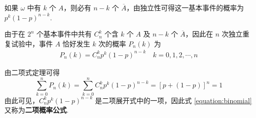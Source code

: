 如果 $\omega$ 中有 $k$ 个 $A$，则必有 $n-k$ 个 $\overline{A}$，由独立性可得这一基本事件的概率为 $p^k (1-p)^{n-k}$.

由于在 $2^n$ 个基本事件中共有 $C_n^k$ 个含 $k$ 个 $A$ 及 $n-k$ 个 $\overline{A}$，因此在 $n$ 次独立重复试验中，事件 $A$ 恰好发生 $k$ 次的概率 $P_n(k)$ 为
\begin{gather} \label{equation:binomial}
    P_n(k)=C_n^k p^k (1-p)^{n-k} \quad k=0,1,2,\cdots,n
\end{gather}

由二项式定理可得
$$
\sum_{k=0}^n P_n(k) = \sum_{k=0}^n C_n^k p^k (1-p)^{n-k} = [p+(1-p)]^n = 1
$$
由此可见，$C_n^k p^k (1-p)^{n-k}$ 是二项展开式中的一项，因此式 \eqref{equation:binomial} 又称为\textbf{二项概率公式}.